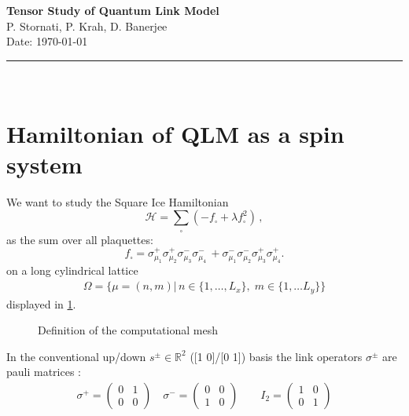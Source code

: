 \documentclass[12pt, a4paper, twoside, titlepage]{article}
\renewcommand{\H}{\ensuremath{\mathcal{H}}}
\begin{document}
\noindent \Large {\textbf{Tensor Study of Quantum Link Model}}
\normalsize
\\[2ex]
P. Stornati, P. Krah, D. Banerjee
\\[1ex]
Date: \today
\\[1ex]
\hrule$~$
  \\[2ex]






\section{Hamiltonian of QLM as a spin system}

We want to study the Square Ice Hamiltonian
\begin{equation}
    \H = \sum_\square (-f_\square + \lambda f^2_\square)\,,\label{eq:hamiltonian}
\end{equation}
as the sum over all plaquettes:
\begin{equation}\label{eq:plaquette}
       f_\square = \sigma^+_{\mu_1}\sigma^+_{\mu_2}\sigma^-_{\mu_3}\sigma^-_{\mu_4}\, +  \sigma^-_{\mu_1}\sigma^-_{\mu_2}\sigma^+_{\mu_3}\sigma^+_{\mu_4}.
\end{equation}
on a long cylindrical lattice
\begin{align}\label{eq:geometry}
\Omega=\{\mu = (n,m) |\, n\in\{1,\dots,L_x\}, \;  m \in\{1,\dots L_y\}\}
\end{align}
displayed in \cref{fig:lattice}.
\begin{figure}[hp!]
  
  \caption{Definition of the computational mesh}
  \label{fig:lattice}
\end{figure}

In the conventional up/down $s^\pm\in\mathbb{R}^2$ ([1 0]/[0 1]) basis the  link operators
$\sigma^{\pm}$ are pauli matrices :
\begin{align}
\sigma^+=
\begin{pmatrix}
0 & 1 \\
0 & 0
\end{pmatrix}
\quad
\sigma^-=
\begin{pmatrix}
0 & 0 \\
1 & 0
\end{pmatrix}
\qquad
I_2 =
\begin{pmatrix}
1 & 0 \\
0 & 1
\end{pmatrix}
\end{align}
\end{document}
